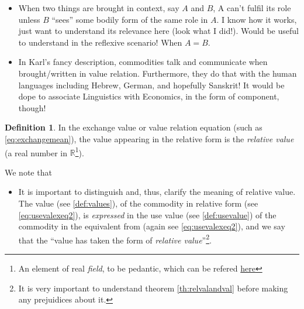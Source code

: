 \documentclass[12pt]{extarticle}
\theoremstyle{definition}
\newtheorem{definition}{Definition}[section]
\newenvironment{remark}[1][Remark]{\begin{trivlist}
\item[\hskip \labelsep {\bfseries #1}]}{\end{trivlist}}
\begin{document}
\begin{remark}
\begin{itemize}
    \item When two things are brought in context, say $A$ and $B$, A can't fulfil its role unless $B$ ``sees'' some bodily form of the same role in $A$.  I know how it works, just want to understand its relevance here (look what I did!).  Would be useful to understand in the reflexive scenario!  When $A=B$.
      \item In Karl's fancy description, commodities talk and communicate when brought/written in value relation.  Furthermore, they do that with the human languages including Hebrew, German, and hopefully Sanskrit!  It would be dope to associate Linguistics with Economics, in the form of component, though!
  \end{itemize}
\end{remark}

\begin{definition}
  \label{def:relval}
  In the exchange value or value relation equation (such as \ref{eq:exchangemean}), the value appearing in the relative form is the \emph{relative value} (a real number in $\mathbb{R}$\footnote{An element of real \emph{field}, to be pedantic, which can be refered \href{https://en.wikipedia.org/wiki/Field_(mathematics)}{here}}).
\end{definition}

\begin{remark}
  We note that
  \begin{itemize}
  \item It is important to distinguish and, thus, clarify the meaning of relative value.  The value (see \ref{def:values}), of the commodity in relative form (see \ref{eq:usevalexeq2}), is \emph{expressed} in the use value (see \ref{def:usevalue}) of the commodity in the equivalent from (again see \ref{eq:usevalexeq2}), and we say that the ``value has taken the form of \emph{relative value}''\footnote{It is very important to understand theorem \ref{th:relvalandval} before making any prejuidices about it.}.
  \end{itemize}
\end{remark}
\end{document}
